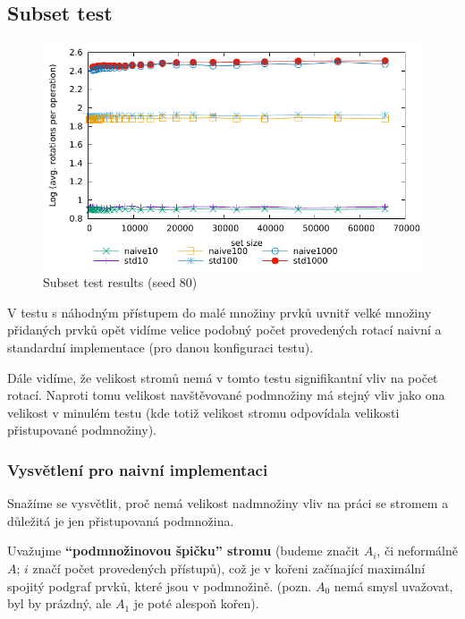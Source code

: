 \documentclass[a4paper,12pt]{article} %
\begin{document}
\pagebreak

\subsection*{Subset test}

\begin{figure}[!htb]
    \caption{Subset test results (seed 80)}
    \label{subset_results}
    \includegraphics{subset2d.pdf}    
\end{figure}

V testu s náhodným přístupem do malé množiny prvků uvnitř velké množiny přidaných prvků opět vidíme velice podobný počet provedených rotací naivní a standardní implementace (pro danou konfiguraci testu).

Dále vidíme, že velikost stromů nemá v tomto testu signifikantní vliv na počet rotací. Naproti tomu velikost navštěvované podmnožiny má stejný vliv jako ona velikost v minulém testu (kde totiž velikost stromu odpovídala velikosti přistupované podmnožiny).


\subsubsection*{Vysvětlení pro naivní implementaci}

Snažíme se vysvětlit, proč nemá velikost nadmnožiny vliv na práci se stromem a důležitá je jen přistupovaná podmnožina.

Uvažujme \textbf{``podmnožinovou špičku'' stromu} (budeme značit $A_i$, či neformálně $A$; $i$ značí počet provedených přístupů), což je v kořeni začínající maximální spojitý podgraf prvků, které jsou v podmnožině. (pozn. $A_0$ nemá smysl uvažovat, byl by prázdný, ale $A_1$ je poté alespoň kořen).
\end{document}

